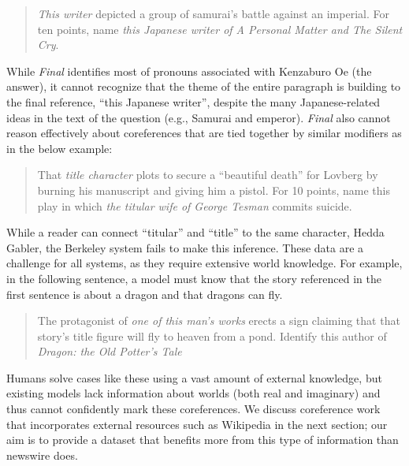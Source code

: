 \begin{quote}
  \emph{This writer} depicted a group of samurai's battle against an imperial. For
  ten points, name \emph{this Japanese writer of A Personal Matter and The
    Silent Cry}.
\end{quote}

While \emph{Final} identifies most of pronouns associated with Kenzaburo Oe (the
answer), it cannot recognize that the theme of the entire paragraph is building
to the final reference, ``this Japanese writer'', despite the many
Japanese-related ideas in the text of the question (e.g., Samurai and
emperor). \emph{Final} also cannot reason effectively about coreferences that
are tied together by similar modifiers as in the below example:
\begin{quote}
  That \emph{title character} plots to secure a ``beautiful death'' for Lovberg
  by burning his manuscript and giving him a pistol. For 10 points, name this
  play in which \emph{the titular wife of George Tesman} commits suicide.
\end{quote}

While a reader can connect ``titular'' and ``title'' to the same character,
Hedda Gabler, the Berkeley system fails to make this inference. These data are a
challenge for all systems, as they require extensive world knowledge.  For
example, in the following sentence, a model must know that the story referenced
in the first sentence is about a dragon and that dragons can fly.
\begin{quote}
  The protagonist of \emph{one of this man's works} erects a sign claiming that
  that story's title figure will fly to heaven from a pond. Identify this author
  of \emph{Dragon: the Old Potter's Tale}
\end{quote}

Humans solve cases like these using a vast amount of external knowledge, but
existing models lack information about worlds (both real and imaginary) and thus
cannot confidently mark these coreferences. We discuss coreference work that
incorporates external resources such as Wikipedia in the next section; our aim
is to provide a dataset that benefits more from this type of information than
newswire does.
